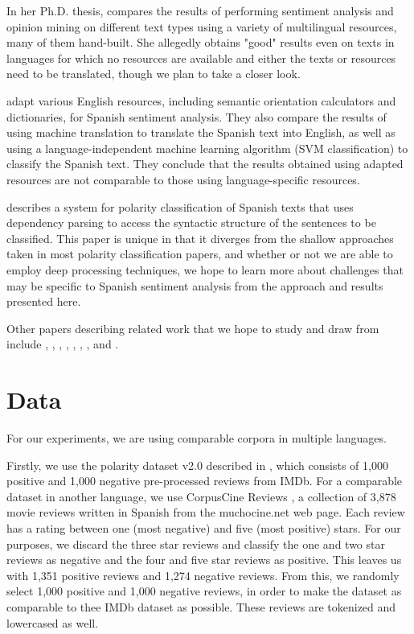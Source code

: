 \documentclass[11pt]{article}
\begin{document}
In her Ph.D. thesis,  compares the results of performing sentiment analysis and opinion mining on different text types using a variety of multilingual resources, many of them hand-built.  She allegedly obtains "good" results even on texts in languages for which no resources are available and either the texts or resources need to be translated, though we plan to take a closer look.

 adapt various English resources, including semantic orientation calculators and dictionaries, for Spanish sentiment analysis.  They also compare the results of using machine translation to translate the Spanish text into English, as well as using a language-independent machine learning algorithm (SVM classification) to classify the Spanish text.  They conclude that the results obtained using adapted resources are not comparable to those using language-specific resources.

 describes a system for polarity classification of Spanish texts that uses dependency parsing to access the syntactic structure of the sentences to be classified.  This paper is unique in that it diverges from the shallow approaches taken in most polarity classification papers, and whether or not we are able to employ deep processing techniques, we hope to learn more about challenges that may be specific to Spanish sentiment analysis from the approach and results presented here.

Other papers describing related work that we hope to study and draw from include , , , , , , , and .

\section{Data}

For our experiments, we are using comparable corpora in multiple languages.

Firstly, we use the polarity dataset v2.0 described in , which consists of 1,000 positive and 1,000 negative pre-processed reviews from IMDb.  For a comparable dataset in another language, we use CorpusCine Reviews \cite{cruzmata2011}, a collection of 3,878 movie reviews written in Spanish from the muchocine.net web page.  Each review has a rating between one (most negative) and five (most positive) stars.  For our purposes, we discard the three star reviews and classify the one and two star reviews as negative and the four and five star reviews as positive.  This leaves us with 1,351 positive reviews and 1,274 negative reviews.  From this, we randomly select 1,000 positive and 1,000 negative reviews, in order to make the dataset as comparable to thee IMDb dataset as possible.  These reviews are tokenized and lowercased as well.
\end{document}
